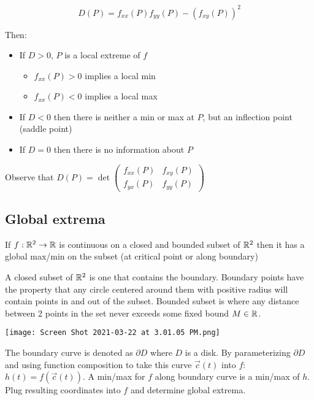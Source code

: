 \[D(P)=f_{x x}(P) f_{y y}(P)-\left(f_{x y}(P)\right)^{2}\]

Then:
\begin{itemize}
    \item If $D>0$, $P$ is a local extreme of $f$
    \begin{itemize}
        \item $f_{xx}(P)>0$ implies a local min
        \item $f_{xx}(P)<0$ implies a local max
    \end{itemize}
    \item If $D<0$ then there is neither a min or max at $P$, but an inflection point (saddle point)
    \item If $D=0$ then there is no information about $P$
\end{itemize}

Observe that $D(P)=\operatorname{det}\left(\begin{array}{ll}
                f_{x x}(P) & f_{x y}(P) \\
                f_{y x}(P) & f_{y y}(P)
            \end{array}\right)$

\subsection{Global extrema}

If $f:\mathbb{R}^2 \rightarrow \mathbb{R}$ is continuous on a closed and bounded subset of $\mathbb{R}^2$ then it has a global max/min
on the subset (at critical point or along boundary)

\par
A closed subset of $\mathbb{R}^2$ is one that contains the boundary. Boundary points have the property that
any circle centered around them with positive radius will contain points in and out of the subset.
Bounded subset is where any distance between 2 points in the set never exceeds some fixed bound $M\in \mathbb{R}$.

\begin{center}
    \texttt{[image: Screen Shot 2021-03-22 at 3.01.05 PM.png]}
\end{center}

The boundary curve is denoted as $\partial D$ where $D$ is a disk. By parameterizing $\partial D$ and using function
composition to take this curve $\vec{c}(t)$ into $f$: $h(t)=f(\vec{c}(t))$. A min/max for $f$ along boundary curve
is a min/max of $h$. Plug resulting coordinates into $f$ and determine global extrema.
